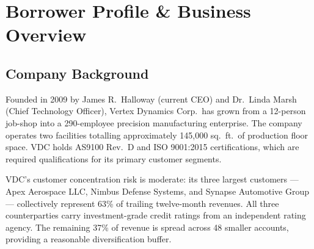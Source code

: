 \documentclass[11pt,a4paper]{article}
\begin{document}
\vspace{4mm}

\section{Borrower Profile \& Business Overview}

\subsection{Company Background}

Founded in 2009 by James R.\ Halloway (current CEO) and Dr.\ Linda Marsh (Chief Technology
Officer), Vertex Dynamics Corp.\ has grown from a 12-person job-shop into a 290-employee
precision manufacturing enterprise. The company operates two facilities totalling approximately
145,000 sq.\ ft.\ of production floor space. VDC holds AS9100 Rev.\ D and ISO 9001:2015
certifications, which are required qualifications for its primary customer segments.

VDC's customer concentration risk is moderate: its three largest customers — Apex Aerospace
LLC, Nimbus Defense Systems, and Synapse Automotive Group — collectively represent 63\% of
trailing twelve-month revenues. All three counterparties carry investment-grade credit ratings
from an independent rating agency. The remaining 37\% of revenue is spread across 48 smaller
accounts, providing a reasonable diversification buffer.

\vspace{4pt}
\end{document}
